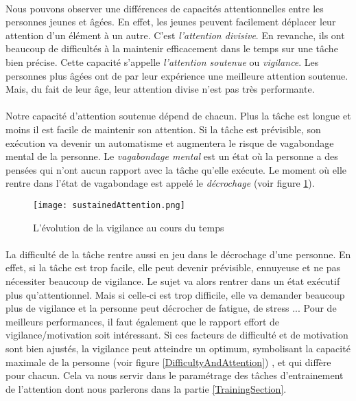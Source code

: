\paragraph{}Nous pouvons observer une différences de capacités attentionnelles entre les personnes jeunes et âgées. En effet, les jeunes peuvent facilement déplacer leur attention
d'un élément à un autre. C'est \emph{l'attention divisive}. En revanche, ils ont beaucoup de difficultés à la maintenir efficacement dans le temps sur une tâche bien précise. Cette capacité
s'appelle \emph{l'attention soutenue} ou \emph{vigilance}. Les personnes plus âgées ont de par leur expérience une meilleure attention soutenue. Mais, du fait de leur âge, leur attention divise n'est pas
très performante.

\paragraph{}Notre capacité d'attention soutenue dépend de chacun. Plus la tâche est longue et moins il est facile de maintenir son attention. Si la tâche est prévisible, son exécution
va devenir un automatisme et augmentera le risque de vagabondage mental de la personne. Le \emph{vagabondage mental} est un état où la personne a des pensées qui n'ont aucun rapport
avec la tâche qu'elle exécute. Le moment où elle rentre dans l'état de vagabondage est appelé le \emph{décrochage} (voir figure \ref{SustainedAttention}).

\begin{figure}[h]
    \begin{center}
    \texttt{[image: sustainedAttention.png]}
    \end{center}
    \caption{L'évolution de la vigilance au cours du temps}
\label{SustainedAttention}
\end{figure}

\paragraph{}La difficulté de la tâche rentre aussi en jeu dans le décrochage d'une personne. En effet, si la tâche est trop facile, elle peut devenir prévisible, ennuyeuse et ne
pas nécessiter beaucoup de vigilance. Le sujet va alors rentrer dans un état exécutif plus qu'attentionnel. Mais si celle-ci est trop difficile, elle va demander beaucoup plus de
vigilance et la personne peut décrocher de fatigue, de stress ... Pour de meilleurs performances, il faut également que le rapport effort de vigilance/motivation soit intéressant. Si
ces facteurs de difficulté et de motivation sont bien ajustés, la vigilance peut atteindre un optimum, symbolisant la capacité maximale de la personne (voir figure
\ref{DifficultyAndAttention}) , et qui diffère pour chacun. Cela va nous servir dans le paramétrage des tâches d'entrainement de l'attention dont nous parlerons dans la partie
\ref{TrainingSection}.


